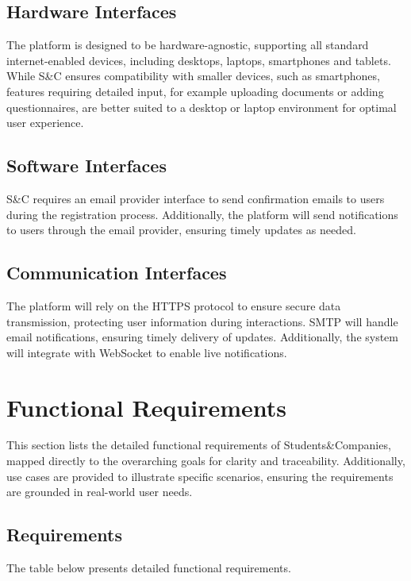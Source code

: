 \subsection{Hardware Interfaces}
The platform is designed to be hardware-agnostic, supporting all standard internet-enabled devices, including desktops, laptops, smartphones and tablets.
While S\&C ensures compatibility with smaller devices, such as smartphones, features requiring detailed input, for example uploading documents or adding questionnaires, are better suited to a desktop or laptop environment for optimal user experience.

\subsection{Software Interfaces}
S\&C requires an email provider interface to send confirmation emails to users during the registration process.
Additionally, the platform will send notifications to users through the email provider, ensuring timely updates as needed.

\subsection{Communication Interfaces}
The platform will rely on the HTTPS protocol to ensure secure data transmission, protecting user information during interactions.
SMTP will handle email notifications, ensuring timely delivery of updates.
Additionally, the system will integrate with WebSocket to enable live notifications.

\section{Functional Requirements}
This section lists the detailed functional requirements of Students\&Companies, mapped directly to the overarching goals for clarity and traceability.
Additionally, use cases are provided to illustrate specific scenarios, ensuring the requirements are grounded in real-world user needs.

\subsection{Requirements}
The table below presents detailed functional requirements.

